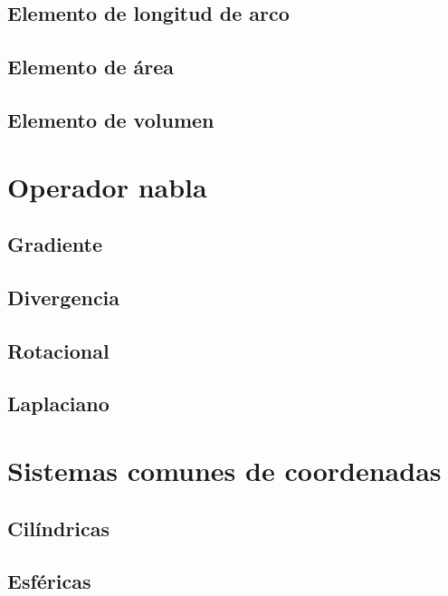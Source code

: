 \documentclass[12pt, fleqn]{report}                             %
\begin{document}
            \subsection{Elemento de longitud de arco}
            
            \subsection{Elemento de área}
            
            \subsection{Elemento de volumen}
            
        \section{Operador nabla}
        
            \subsection{Gradiente}
            
            \subsection{Divergencia}
            
            \subsection{Rotacional}
            
            \subsection{Laplaciano}
            
        \section{Sistemas comunes de coordenadas}
        
            \subsection{Cilíndricas}
            
            \subsection{Esféricas}
            
\end{document}
